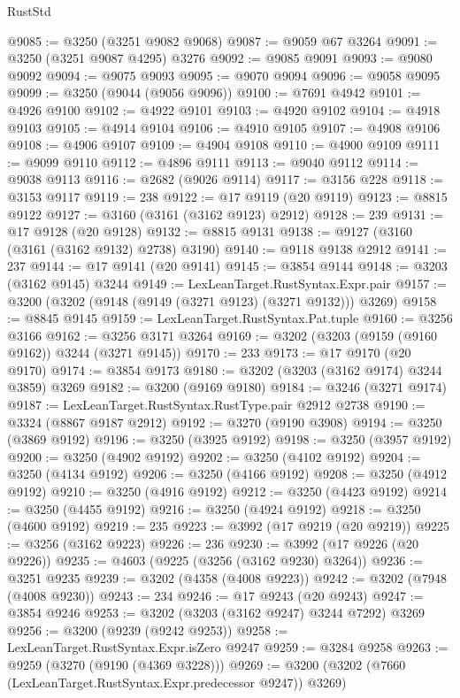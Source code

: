 \begin{lexlean}{RustStd}
\begin{coremodule}
@9085 := @3250 (@3251 @9082 @9068)
@9087 := @9059 @67 @3264
@9091 := @3250 (@3251 @9087 @4295) @3276
@9092 := @9085 @9091
@9093 := @9080 @9092
@9094 := @9075 @9093
@9095 := @9070 @9094
@9096 := @9058 @9095
@9099 := @3250 (@9044 (@9056 @9096))
@9100 := @7691 @4942
@9101 := @4926 @9100
@9102 := @4922 @9101
@9103 := @4920 @9102
@9104 := @4918 @9103
@9105 := @4914 @9104
@9106 := @4910 @9105
@9107 := @4908 @9106
@9108 := @4906 @9107
@9109 := @4904 @9108
@9110 := @4900 @9109
@9111 := @9099 @9110
@9112 := @4896 @9111
@9113 := @9040 @9112
@9114 := @9038 @9113
@9116 := @2682 (@9026 @9114)
@9117 := @3156 @228
@9118 := @3153 @9117
@9119 := 238
@9122 := @17 @9119 (@20 @9119)
@9123 := @8815 @9122
@9127 := @3160 (@3161 (@3162 @9123) @2912)
@9128 := 239
@9131 := @17 @9128 (@20 @9128)
@9132 := @8815 @9131
@9138 := @9127 (@3160 (@3161 (@3162 @9132) @2738) @3190)
@9140 := @9118 @9138 @2912
@9141 := 237
@9144 := @17 @9141 (@20 @9141)
@9145 := @3854 @9144
@9148 := @3203 (@3162 @9145) @3244
@9149 := LexLeanTarget.RustSyntax.Expr.pair
@9157 := @3200 (@3202 (@9148 (@9149 (@3271 @9123) (@3271 @9132))) @3269)
@9158 := @8845 @9145
@9159 := LexLeanTarget.RustSyntax.Pat.tuple
@9160 := @3256 @3166
@9162 := @3256 @3171 @3264
@9169 := @3202 (@3203 (@9159 (@9160 @9162)) @3244 (@3271 @9145))
@9170 := 233
@9173 := @17 @9170 (@20 @9170)
@9174 := @3854 @9173
@9180 := @3202 (@3203 (@3162 @9174) @3244 @3859) @3269
@9182 := @3200 (@9169 @9180)
@9184 := @3246 (@3271 @9174)
@9187 := LexLeanTarget.RustSyntax.RustType.pair @2912 @2738
@9190 := @3324 (@8867 @9187 @2912)
@9192 := @3270 (@9190 @3908)
@9194 := @3250 (@3869 @9192)
@9196 := @3250 (@3925 @9192)
@9198 := @3250 (@3957 @9192)
@9200 := @3250 (@4902 @9192)
@9202 := @3250 (@4102 @9192)
@9204 := @3250 (@4134 @9192)
@9206 := @3250 (@4166 @9192)
@9208 := @3250 (@4912 @9192)
@9210 := @3250 (@4916 @9192)
@9212 := @3250 (@4423 @9192)
@9214 := @3250 (@4455 @9192)
@9216 := @3250 (@4924 @9192)
@9218 := @3250 (@4600 @9192)
@9219 := 235
@9223 := @3992 (@17 @9219 (@20 @9219))
@9225 := @3256 (@3162 @9223)
@9226 := 236
@9230 := @3992 (@17 @9226 (@20 @9226))
@9235 := @4603 (@9225 (@3256 (@3162 @9230) @3264))
@9236 := @3251 @9235
@9239 := @3202 (@4358 (@4008 @9223))
@9242 := @3202 (@7948 (@4008 @9230))
@9243 := 234
@9246 := @17 @9243 (@20 @9243)
@9247 := @3854 @9246
@9253 := @3202 (@3203 (@3162 @9247) @3244 @7292) @3269
@9256 := @3200 (@9239 (@9242 @9253))
@9258 := LexLeanTarget.RustSyntax.Expr.isZero @9247
@9259 := @3284 @9258
@9263 := @9259 (@3270 (@9190 (@4369 @3228)))
@9269 := @3200 (@3202 (@7660 (LexLeanTarget.RustSyntax.Expr.predecessor @9247)) @3269)

\end{coremodule}
\end{lexlean}
